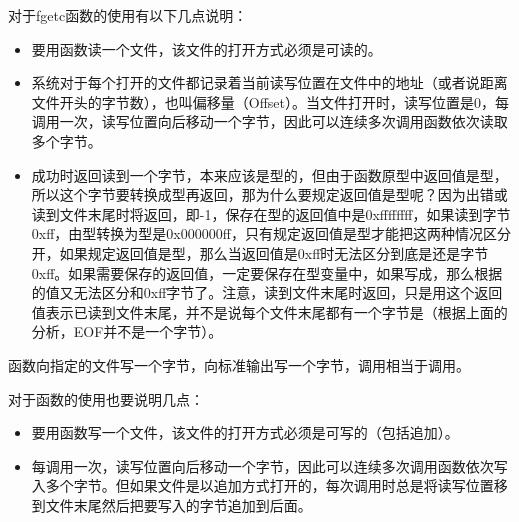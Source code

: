 对于fgetc函数的使用有以下几点说明：


\begin{itemize}

\item 要用函数读一个文件，该文件的打开方式必须是可读的。

\item 系统对于每个打开的文件都记录着当前读写位置在文件中的地址（或者说距离文件开头的字节数），也叫偏移量（Offset）。当文件打开时，读写位置是0，每调用一次，读写位置向后移动一个字节，因此可以连续多次调用函数依次读取多个字节。

\item {}成功时返回读到一个字节，本来应该是型的，但由于函数原型中返回值是型，所以这个字节要转换成型再返回，那为什么要规定返回值是型呢？因为出错或读到文件末尾时将返回，即-1，保存在型的返回值中是0xffffffff，如果读到字节0xff，由型转换为型是0x000000ff，只有规定返回值是型才能把这两种情况区分开，如果规定返回值是型，那么当返回值是0xff时无法区分到底是还是字节0xff。如果需要保存的返回值，一定要保存在型变量中，如果写成，那么根据的值又无法区分和0xff字节了。注意，读到文件末尾时返回，只是用这个返回值表示已读到文件末尾，并不是说每个文件末尾都有一个字节是（根据上面的分析，EOF并不是一个字节）。
\end{itemize}


函数向指定的文件写一个字节，向标准输出写一个字节，调用相当于调用。




对于函数的使用也要说明几点：


\begin{itemize}

\item 要用函数写一个文件，该文件的打开方式必须是可写的（包括追加）。

\item 每调用一次，读写位置向后移动一个字节，因此可以连续多次调用函数依次写入多个字节。但如果文件是以追加方式打开的，每次调用时总是将读写位置移到文件末尾然后把要写入的字节追加到后面。
\end{itemize}


